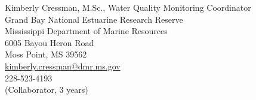 \documentclass[letterpaper,12pt]{article}
\begin{document}
Kimberly Cressman, M.Sc., Water Quality Monitoring Coordinator \\
Grand Bay National Estuarine Research Reserve \\
Mississippi Department of Marine Resources \\
6005 Bayou Heron Road \\
Moss Point, MS 39562 \\
\href{mailto:kimberly.cressman@dmr.ms.gov}{kimberly.cressman@dmr.ms.gov} \\
228-523-4193 \\
(Collaborator, 3 years) \\



\end{document}

